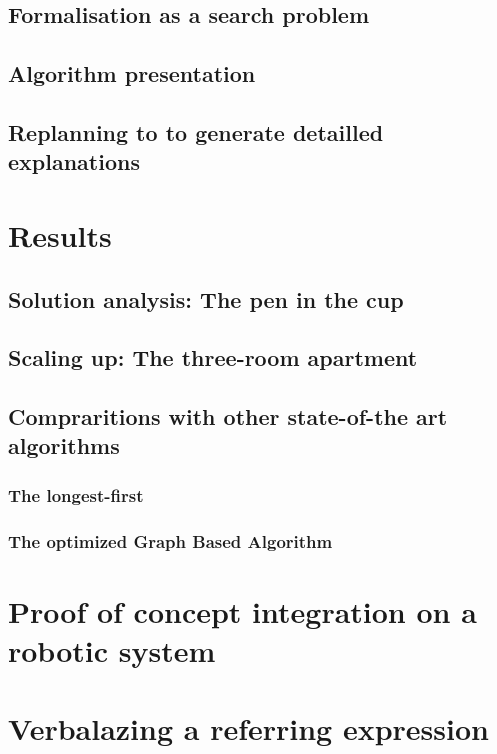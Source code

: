 \subsection{Formalisation as a search problem}

\subsection{Algorithm presentation}

\subsection{Replanning to to generate detailled explanations}

\section{Results}

\subsection{Solution analysis: The pen in the cup}

\subsection{Scaling up: The three-room apartment}

\subsection{Compraritions with other state-of-the art algorithms}

\subsubsection{The longest-first}

\subsubsection{The optimized Graph Based Algorithm}

\section{Proof of concept integration on a robotic system}

\section{Verbalazing a referring expression}

